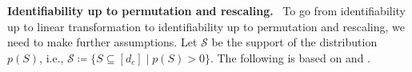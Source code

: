 \documentclass{article}
\newtheorem{assumption}{Assumption}    %
\DeclareRobustCommand{\parhead}[1]{\textbf{#1}~}
\newcommand{\deltaBold}{\boldsymbol{\delta}}
\newcommand{\deltaz}{\deltaBold^z}
\newcommand{\hatdeltaz}{\hat{\deltaBold}^z}
\newcommand{\deltac}{\deltaBold^c}
\begin{document}
\parhead{Identifiability up to permutation and rescaling.} To go from identifiability up to linear transformation to identifiability up to permutation and rescaling, we need to make further assumptions. Let $\mathcal{S}$ be the support of the distribution $p(S)$, i.e., $\mathcal{S} \coloneqq \{S \subseteq [d_c] \mid p(S) > 0\}$. The following is based on \citet{lachapelle2023synergies} and \citet{xu2024sparsityprinciplepartiallyobservable}.




\end{document}

